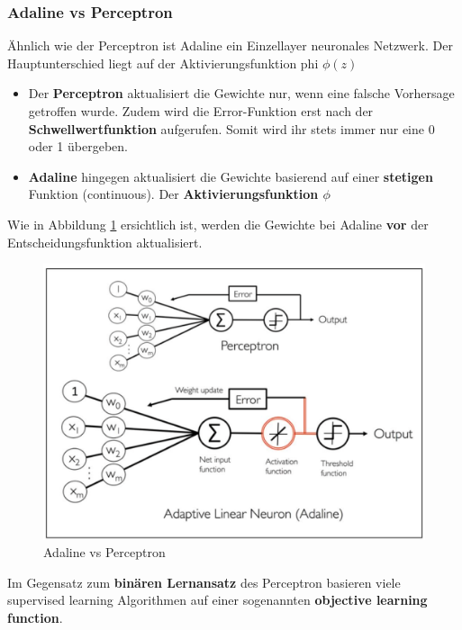 \newpage
\subsubsection{Adaline vs Perceptron}

Ähnlich wie der Perceptron ist Adaline ein Einzellayer neuronales Netzwerk. Der Hauptunterschied liegt auf der Aktivierungsfunktion phi $\phi(z)$


\begin{itemize}
  \item Der \textbf{Perceptron} aktualisiert die Gewichte nur, wenn eine falsche Vorhersage getroffen wurde. Zudem wird die Error-Funktion erst nach der \textbf{Schwellwertfunktion} aufgerufen. Somit wird ihr stets immer nur eine 0 oder 1 übergeben.
  \item \textbf{Adaline} hingegen aktualisiert die Gewichte basierend auf einer \textbf{stetigen} Funktion (continuous). Der \textbf{Aktivierungsfunktion $\phi$}
 \end{itemize}



Wie in Abbildung \ref{fig:adaline_vs_perceptron} ersichtlich ist, werden die Gewichte bei Adaline \textbf{vor} der Entscheidungsfunktion aktualisiert.

\begin{figure}[h!]
	\includegraphics[scale=0.6]{figures/adaline_vs_perceptron}
	\caption{Adaline vs Perceptron}
	\label{fig:adaline_vs_perceptron}
\end{figure}

Im Gegensatz zum \textbf{binären Lernansatz} des Perceptron basieren viele supervised learning Algorithmen auf einer sogenannten \textbf{objective learning function}.


